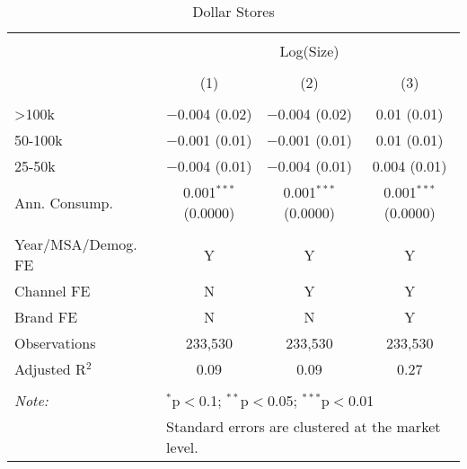 
\begin{table}[!htbp] \centering 
  \caption{Dollar Stores} 
  \label{tab:packageSizeDollarDetergent} 
\begin{tabular}{@{\extracolsep{5pt}}lccc} 
\\[-1.8ex]\hline 
\hline \\[-1.8ex] 
 & \multicolumn{3}{c}{Log(Size)} \\ 
\\[-1.8ex] & (1) & (2) & (3)\\ 
\hline \\[-1.8ex] 
 >100k & $-$0.004 (0.02) & $-$0.004 (0.02) & 0.01 (0.01) \\ 
  50-100k & $-$0.001 (0.01) & $-$0.001 (0.01) & 0.01 (0.01) \\ 
  25-50k & $-$0.004 (0.01) & $-$0.004 (0.01) & 0.004 (0.01) \\ 
  Ann. Consump. & 0.001$^{***}$ (0.0000) & 0.001$^{***}$ (0.0000) & 0.001$^{***}$ (0.0000) \\ 
 \hline \\[-1.8ex] 
Year/MSA/Demog. FE & Y & Y & Y \\ 
Channel FE & N & Y & Y \\ 
Brand FE & N & N & Y \\ 
Observations & 233,530 & 233,530 & 233,530 \\ 
Adjusted R$^{2}$ & 0.09 & 0.09 & 0.27 \\ 
\hline 
\hline \\[-1.8ex] 
\textit{Note:}  & \multicolumn{3}{l}{$^{*}$p$<$0.1; $^{**}$p$<$0.05; $^{***}$p$<$0.01} \\ 
 & \multicolumn{3}{l}{Standard errors are clustered at the market level.} \\ 
\end{tabular} 
\end{table} 
